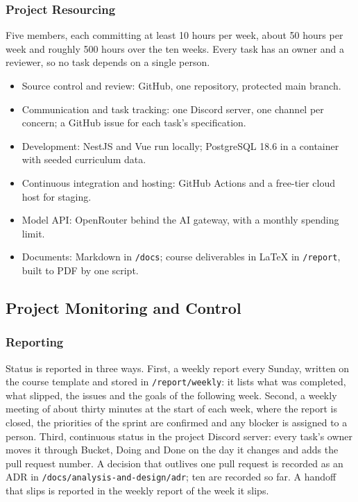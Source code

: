 \documentclass{article}
\newcommand{\chg}[1]{\textcolor{chg}{#1}}
\begin{document}
\subsubsection{Project Resourcing}
Five members, each committing at least 10 hours per week, about 50 hours per week and roughly 500 hours over the ten
weeks. Every task has an owner and a reviewer, so no task depends on a single person.
\begin{itemize}
  \item Source control and review: GitHub, one repository, protected main branch.
  \item Communication and task tracking: one Discord server, one channel per concern\chg{; a GitHub issue for each task's
        specification}.
  \item Development: NestJS and Vue run locally; PostgreSQL \chg{18.6 in a container} with seeded curriculum data.
  \item Continuous integration and hosting: GitHub Actions and a free-tier cloud host for staging.
  \item \chg{Model API: OpenRouter behind the AI gateway, with a monthly spending limit.}
  \item Documents: Markdown in \texttt{/docs}; \chg{course deliverables in LaTeX in \texttt{/report}, built to PDF by one
        script.}
\end{itemize}

\subsection{Project Monitoring and Control}
\subsubsection{Reporting}
Status is reported in three ways. First, a weekly report every Sunday, written on the course template \chg{and stored in
\texttt{/report/weekly}}: it lists what was completed, what slipped, the issues and the goals of the following week. Second,
a weekly meeting of about thirty minutes at the start of each week, where the report is closed, the priorities of the sprint
are confirmed and any blocker is assigned to a person. Third, continuous status in the project Discord server: every task's
owner moves it through \chg{Bucket, Doing and Done} on the day it changes and adds the pull request number. \chg{A decision
that outlives one pull request is recorded as an ADR in \texttt{/docs/analysis-and-design/adr}; ten are recorded so far. A
handoff that slips is reported in the weekly report of the week it slips.}
\end{document}
